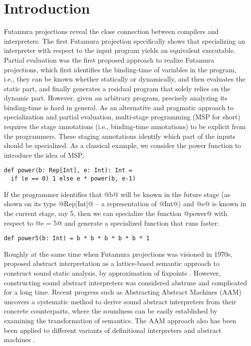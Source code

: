 \section{Introduction}

Futamura projections \cite{Futamura1999, futamura1971partial} reveal the close
connection between compilers and interpreters. The first Futamura projection
specifically shows that specializing an interpreter with respect to the input
program yields an equivalent executable. Partial evaluation
\cite{DBLP:books/daglib/0072559} was the first proposed approach to realize
Futamura projections, which first identifies the binding-time of variables in
the program, i.e., they can be known whether statically or dynamically, and then
evaluates the static part, and finally generates a residual program that solely
relies on the dynamic part. However, given an arbitrary program, precisely
analyzing its binding-time is hard in general. As an alternative and pragmatic
approach to specialization and partial evaluation, multi-stage programming (MSP
for short) \cite{taha1999multi, DBLP:conf/pepm/TahaS97} requires the stage
annotations (i.e., binding-time annotations) to be explicit from the programmers.
These staging annotations identify which part of the inputs should be
specialized. As a classical example, we consider the power function to introduce
the idea of MSP:

\begin{lstlisting}
def power(b: Rep[Int], e: Int): Int = 
  if (e == 0) 1 else e * power(b, e-1)
\end{lstlisting}

If the programmer identifies that @b@ will be known in the future stage (as shown
on its type @Rep[Int]@ -- a representation of @Int@) and @e@ is known in the
current stage, say 5, then we can specialize the function @power@ with
respect to @e = 5@ and generate a specialized function that runs faster:

\begin{lstlisting}
def power5(b: Int) = b * b * b * b * b * 1
\end{lstlisting}


Roughly at the same time when Futamura projections was visioned in 1970s,
\citeauthor{DBLP:conf/popl/CousotC77} proposed abstract interpretation as a
lattice-based semantic approach to construct sound static analysis, by
approximation of fixpoints \cite{DBLP:conf/popl/CousotC77}. However,
constructing sound abstract interpreters was considered abstruse and complicated
for a long time.
Recent progress such as Abstracting Abstract Machines (AAM)
uncovers a systematic method to derive sound abstract interpreters from their
concrete counterparts, where the soundness can be easily established by
examining the transformation of semantics.
The AAM approach also has been been applied to different variants of
definitional interpreters and abstract machines \cite{DBLP:journals/jfp/HornM12,
DBLP:conf/icfp/HornM10, DBLP:journals/pacmpl/DaraisLNH17}.

